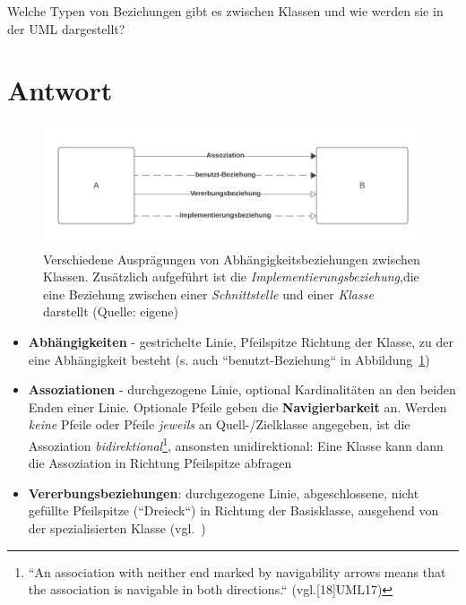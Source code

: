 Welche Typen von Beziehungen gibt es zwischen Klassen und wie werden sie in der UML dargestellt?


\section*{Antwort}

\begin{figure}
    \centering
    \includegraphics[scale=0.4]{chapters/aufgabe 1/img/umldependencies}
    \caption{Verschiedene Ausprägungen von Abhängigkeitsbeziehungen zwischen Klassen.
    Zusätzlich aufgeführt ist die \textit{Implementierungsbeziehung},die eine Beziehung zwischen einer \textit{Schnittstelle} und einer \textit{Klasse} darstellt (Quelle: eigene)}
    \label{fig:umldependencies}
\end{figure}

\begin{itemize}
    \item \textbf{Abhängigkeiten} - gestrichelte Linie, Pfeilspitze Richtung der Klasse, zu der eine Abhängigkeit besteht (s. auch ``benutzt-Beziehung`` in Abbildung~\ref{fig:umldependencies})
    \item \textbf{Assoziationen} - durchgezogene Linie, optional Kardinalitäten an den beiden Enden einer Linie.
    Optionale Pfeile geben die \textbf{Navigierbarkeit} an.
    Werden \textit{keine} Pfeile oder Pfeile \textit{jeweils} an Quell-/Zielklasse angegeben, ist die Assoziation \textit{bidirektional}\footnote{
    ``An association with neither end marked by navigability arrows means that the association is navigable in both
    directions.`` (vgl.[18]{UML17})
    }, ansonsten unidirektional: Eine Klasse kann dann die Assoziation in Richtung Pfeilspitze abfragen
    \item \textbf{Vererbungsbeziehungen}: durchgezogene Linie, abgeschlossene, nicht gefüllte Pfeilspitze (``Dreieck``) in Richtung der Basisklasse, ausgehend von der spezialisierten Klasse (vgl.~\cite[52]{Bal05})
\end{itemize}